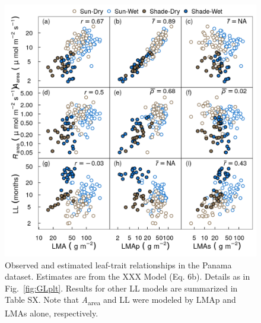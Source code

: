 \documentclass[
  12pt,
  a4paper,
,tablecaptionabove
]{scrartcl}
\begin{document}
\begin{figure}
\hypertarget{fig:PAplt}{%
\centering
\includegraphics{../figs/pa_point.png}
\caption{Observed and estimated leaf-trait relationships in the Panama dataset.
Estimates are from the XXX Model (Eq. 6b).
Details as in Fig.~\ref{fig:GLplt}.
Results for other LL models are summarized in Table SX.
Note that \emph{A}\textsubscript{area} and LL were modeled by LMAp and LMAs alone, respectively.}\label{fig:PAplt}
}
\end{figure}

\newpage
\end{document}
